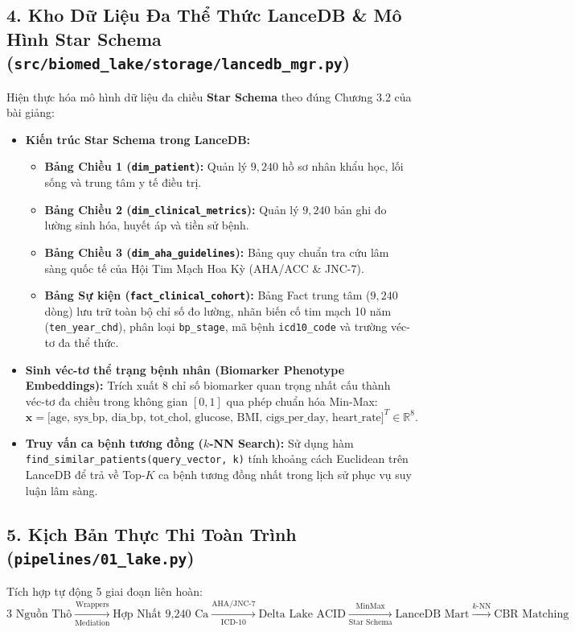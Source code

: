 \documentclass[11pt,a4paper]{article}
\begin{document}
\subsection{4. Kho Dữ Liệu Đa Thể Thức LanceDB \& Mô Hình Star Schema (\texttt{src/biomed_lake/storage/lancedb_mgr.py})}
Hiện thực hóa mô hình dữ liệu đa chiều \textbf{Star Schema} theo đúng Chương 3.2 của bài giảng:
\begin{itemize}
    \item \textbf{Kiến trúc Star Schema trong LanceDB:}
    \begin{itemize}
        \item \textbf{Bảng Chiều 1 (\texttt{dim\_patient}):} Quản lý $9{,}240$ hồ sơ nhân khẩu học, lối sống và trung tâm y tế điều trị.
        \item \textbf{Bảng Chiều 2 (\texttt{dim\_clinical\_metrics}):} Quản lý $9{,}240$ bản ghi đo lường sinh hóa, huyết áp và tiền sử bệnh.
        \item \textbf{Bảng Chiều 3 (\texttt{dim\_aha_guidelines}):} Bảng quy chuẩn tra cứu lâm sàng quốc tế của Hội Tim Mạch Hoa Kỳ (AHA/ACC \& JNC-7).
        \item \textbf{Bảng Sự kiện (\texttt{fact\_clinical\_cohort}):} Bảng Fact trung tâm ($9{,}240$ dòng) lưu trữ toàn bộ chỉ số đo lường, nhãn biến cố tim mạch 10 năm (\texttt{ten\_year\_chd}), phân loại \texttt{bp\_stage}, mã bệnh \texttt{icd10_code} và trường véc-tơ đa thể thức.
    \end{itemize}
    \item \textbf{Sinh véc-tơ thể trạng bệnh nhân (Biomarker Phenotype Embeddings):}
    Trích xuất 8 chỉ số biomarker quan trọng nhất cấu thành véc-tơ đa chiều trong không gian $[0, 1]$ qua phép chuẩn hóa Min-Max:
    \begin{equation}
        \bm{x} = \big[ \text{age},\, \text{sys\_bp},\, \text{dia\_bp},\, \text{tot\_chol},\, \text{glucose},\, \text{BMI},\, \text{cigs\_per\_day},\, \text{heart\_rate} \big]^T \in \mathbb{R}^8.
    \end{equation}
    \item \textbf{Truy vấn ca bệnh tương đồng ($k$-NN Search):} Sử dụng hàm \texttt{find\_similar\_patients(query\_vector, k)} tính khoảng cách Euclidean trên LanceDB để trả về Top-$K$ ca bệnh tương đồng nhất trong lịch sử phục vụ suy luận lâm sàng.
\end{itemize}

\subsection{5. Kịch Bản Thực Thi Toàn Trình (\texttt{pipelines/01_lake.py})}
Tích hợp tự động 5 giai đoạn liên hoàn:
$$\text{3 Nguồn Thô} \xrightarrow[\text{Mediation}]{\text{Wrappers}} \text{Hợp Nhất 9,240 Ca} \xrightarrow[\text{ICD-10}]{\text{AHA/JNC-7}} \text{Delta Lake ACID} \xrightarrow[\text{Star Schema}]{\text{MinMax}} \text{LanceDB Mart} \xrightarrow{k\text{-NN}} \text{CBR Matching}$$
\end{document}
